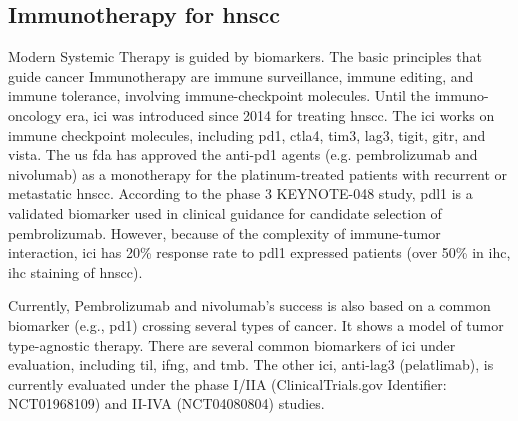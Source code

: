 \documentclass[12pt, a4paper]{article}
\begin{document}
\subsection{Immunotherapy for \acrshort{hnscc}}
Modern Systemic Therapy is guided by biomarkers.
The basic principles that guide cancer Immunotherapy are immune surveillance, immune editing, and immune tolerance\citep{Sharma2017}, involving immune-checkpoint molecules.
Until the immuno-oncology era, \acrfull{ici} was introduced since 2014 for treating \acrshort{hnscc}\citep{Seiwert2014}\citep{Swanson2015}.
The \acrshort{ici} works on immune checkpoint molecules, including \acrfull{pd1}, \acrfull{ctla4}, \acrfull{tim3}, \acrfull{lag3}, \acrfull{tigit}, \acrfull{gitr}, and \acrfull{vista}\citep{Mei2020}.
The \acrshort{us} \acrshort{fda} has approved the anti-\acrshort{pd1} agents (e.g. pembrolizumab and nivolumab) as a monotherapy for the platinum-treated patients with recurrent or metastatic \acrshort{hnscc}\citep{Cramer2019}. 
According to the phase 3 KEYNOTE-048 study, \acrshort{pdl1} is a validated biomarker used in clinical guidance for candidate selection of pembrolizumab\citep{Burtness2019}\citep{Gavrielatou2020}.
However, because of the complexity of immune-tumor interaction, \acrshort{ici} has 20\% response rate to \acrfull{pdl1} expressed patients (over 50\% in \acrlong{ihc}, \acrshort{ihc} staining of \acrshort{hnscc})\citep{Swanson2015}\citep{Gavrielatou2020}.

Currently, Pembrolizumab and nivolumab's success is also based on a common biomarker (e.g., \acrshort{pd1}) crossing several types of cancer.
It shows a model of tumor type-agnostic therapy\citep{Yan2018}.
There are several common biomarkers of \acrfull{ici} under evaluation, including \acrfull{til}, \acrfull{ifng}, and \acrfull{tmb}\citep{Gavrielatou2020}.
The other \acrshort{ici}, anti-\acrshort{lag3} (pelatlimab), is currently evaluated under the phase I/IIA\citep{Cristina2019} (ClinicalTrials.gov Identifier: NCT01968109) and II-IVA\citep{Neal2019} (NCT04080804) studies.

\end{document}
